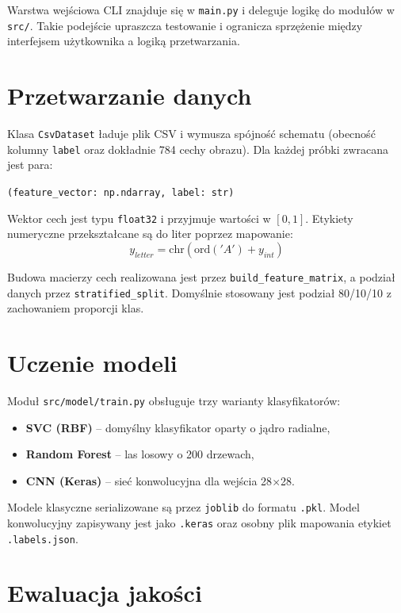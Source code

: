 Warstwa wejściowa CLI znajduje się w \texttt{main.py} i deleguje logikę do
modułów w \texttt{src/}. Takie podejście upraszcza testowanie i ogranicza
sprzężenie między interfejsem użytkownika a logiką przetwarzania.

\section{Przetwarzanie danych}
\label{sec:przetwarzanie_danych}

Klasa \texttt{CsvDataset} ładuje plik CSV i wymusza spójność schematu
(obecność kolumny \texttt{label} oraz dokładnie 784 cechy obrazu). Dla każdej
próbki zwracana jest para:
\begin{center}
    \texttt{(feature\_vector: np.ndarray, label: str)}
\end{center}

Wektor cech jest typu \texttt{float32} i przyjmuje wartości w $[0,1]$.
Etykiety numeryczne przekształcane są do liter poprzez mapowanie:
\begin{equation}
    y_{letter} = \mathrm{chr}(\mathrm{ord}('A') + y_{int})
\end{equation}

Budowa macierzy cech realizowana jest przez \texttt{build\_feature\_matrix},
a podział danych przez \texttt{stratified\_split}. Domyślnie stosowany jest
podział 80/10/10 z zachowaniem proporcji klas.

\section{Uczenie modeli}
\label{sec:uczenie_modeli}

Moduł \texttt{src/model/train.py} obsługuje trzy warianty klasyfikatorów:
\begin{itemize}
    \item \textbf{SVC (RBF)} -- domyślny klasyfikator oparty o jądro radialne,
    \item \textbf{Random Forest} -- las losowy o 200 drzewach,
    \item \textbf{CNN (Keras)} -- sieć konwolucyjna dla wejścia 28$\times$28.
\end{itemize}

Modele klasyczne serializowane są przez \texttt{joblib} do formatu
\texttt{.pkl}. Model konwolucyjny zapisywany jest jako \texttt{.keras}
oraz osobny plik mapowania etykiet \texttt{.labels.json}.

\section{Ewaluacja jakości}
\label{sec:ewaluacja_jakosci}

